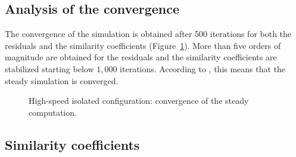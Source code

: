 
\subsection{Analysis of the convergence}
\label{sub:dream_hs_steady_conv}

The convergence of the simulation is obtained 
after 500 iterations for both
the residuals and the similarity coefficients 
(Figure~\ref{fig:dream_HS_convergence_roe2}). More than
five orders of magnitude are obtained for the residuals and
the similarity coefficients are stabilized starting below
$1,000$ iterations. According to \citet{Casey2000},
this means that the steady simulation is converged.
\begin{figure}[htp]
  \centering
  \caption{High-speed isolated configuration: convergence of the steady
  computation.}
  \label{fig:dream_HS_convergence_roe2}
\end{figure}

\subsection{Similarity coefficients}
\label{sub:dream_hs_sim_coeff}


